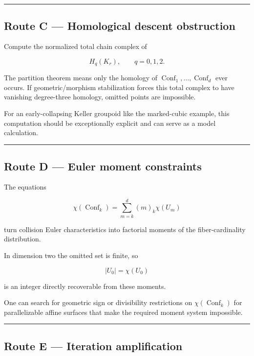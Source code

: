 \begin{center}\rule{0.5\linewidth}{0.5pt}\end{center}

\subsection{Route C --- Homological descent
obstruction}\label{route-c-homological-descent-obstruction}

Compute the normalized total chain complex of

\[
H_q(K_r),\qquad q=0,1,2.
\]

The partition theorem means only the homology of
\(\operatorname{Conf}_1,\dots,\operatorname{Conf}_d\) ever occurs. If
geometric/morphism stabilization forces this total complex to have
vanishing degree-three homology, omitted points are impossible.

For an early-collapsing Keller groupoid like the marked-cubic example,
this computation should be exceptionally explicit and can serve as a
model calculation.

\begin{center}\rule{0.5\linewidth}{0.5pt}\end{center}

\subsection{Route D --- Euler moment
constraints}\label{route-d-euler-moment-constraints}

The equations

\[
\chi(\operatorname{Conf}_k)
=
\sum_{m=k}^d(m)_k\chi(U_m)
\]

turn collision Euler characteristics into factorial moments of the
fiber-cardinality distribution.

In dimension two the omitted set is finite, so

\[
|U_0|=\chi(U_0)
\]

is an integer directly recoverable from these moments.

One can search for geometric sign or divisibility restrictions on
\(\chi(\operatorname{Conf}_k)\) for parallelizable affine surfaces that
make the required moment system impossible.

\begin{center}\rule{0.5\linewidth}{0.5pt}\end{center}

\subsection{Route E --- Iteration
amplification}\label{route-e-iteration-amplification}

